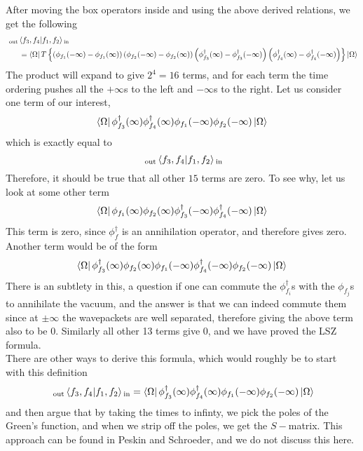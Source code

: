 \documentclass[11pt, notitlepage]{report}
\numberwithin{equation}{section}
\begin{document}
After moving the box operators inside and using the above derived relations, we get the following
\begin{align*}
    &{~}_{\text{out}}\braket{f_3, f_4|f_1, f_2}{}_{\text{in}} \\
    &~~~~~= \bra{\Omega} T\left\{  \left(  \phi_{f_1}(-\infty) - \phi_{f_1}(\infty)  \right) \left(  \phi_{f_2}(-\infty) - \phi_{f_2}(\infty)  \right) \left(  \phi^\dagger_{f_3}(\infty) - \phi^\dagger_{f_3}(-\infty)  \right) \left(  \phi^\dagger_{f_4}(\infty) - \phi^\dagger_{f_4}(-\infty)  \right)   \right\} \ket{\Omega}    
\end{align*}
The product will expand to give \(2^4 = 16\) terms, and for each term the time ordering pushes all the \(+\infty\)s to the left and \(-\infty\)s to the right. Let us consider one term of our interest, 
\begin{equation*}
    \bra{\Omega} \phi^\dagger_{f_3}(\infty)\phi_{f_4}^\dagger(\infty) \phi_{f_1}(-\infty)\phi_{f_2}(-\infty)\ket{\Omega}
\end{equation*}
which is exactly equal to 
\begin{equation*}
    {~}_{\text{out}}\braket{f_3, f_4|f_1, f_2}{}_{\text{in}}
\end{equation*}
Therefore, it should be true that all other \(15\) terms are zero. To see why, let us look at some other term 
\begin{equation*}
    \bra{\Omega} \phi_{f_1}(\infty)\phi_{f_2}(\infty)\phi^\dagger_{f_3}(-\infty)\phi_{f_4}^\dagger(-\infty) \ket{\Omega}
\end{equation*}
This term is zero, since \(\phi_f^\dagger\) is an annihilation operator, and therefore gives zero. 
Another term would be of the form 
\begin{equation*}
    \bra{\Omega} \phi^\dagger_{f_3}(\infty)\phi_{f_2}(\infty) \phi_{f_1}(-\infty)\phi_{f_4}^\dagger(-\infty)\phi_{f_2}(-\infty)\ket{\Omega}    
\end{equation*}
There is an subtlety in this, a question if one can commute the \(\phi_{f_i}^\dagger\)s with the \(\phi_{f_j}\)s to annihilate the vacuum, and the answer is that we can indeed commute them since at \(\pm\infty\) the wavepackets are well separated, therefore giving the above term also to be 0. Similarly all other 13 terms give 0, and we have proved the LSZ formula.\\

There are other ways to derive this formula, which would roughly be to start with this definition 
\begin{equation*}
    {~}_{\text{out}}\braket{f_3, f_4|f_1, f_2}{}_{\text{in}} = \bra{\Omega} \phi^\dagger_{f_3}(\infty)\phi_{f_4}^\dagger(\infty) \phi_{f_1}(-\infty)\phi_{f_2}(-\infty)\ket{\Omega}
\end{equation*}
and then argue that by taking the times to infinty, we pick the poles of the Green's function, and when we strip off the poles, we get the \(S-\)matrix. This approach can be found in Peskin and Schroeder, and we do not discuss this here. \\
\end{document}
